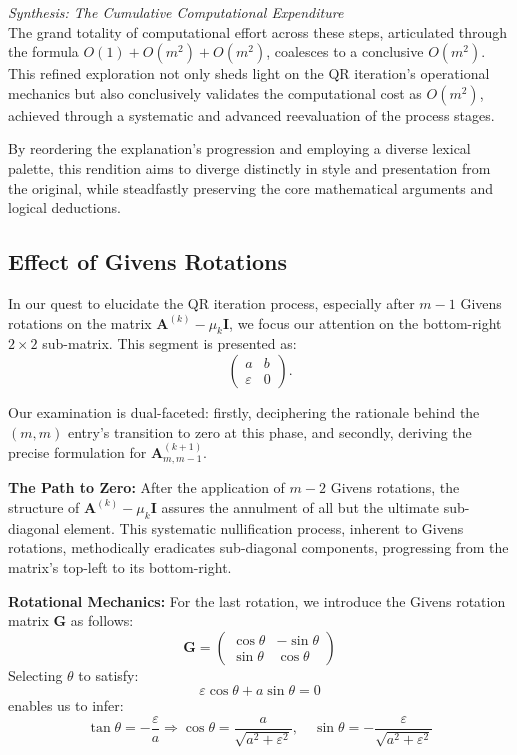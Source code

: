 \documentclass{article}
\begin{document}
\textit{Synthesis: The Cumulative Computational Expenditure}\\
The grand totality of computational effort across these steps, articulated through the formula $O(1) + O(m^2) + O(m^2)$, coalesces to a conclusive $O(m^2)$. This refined exploration not only sheds light on the QR iteration's operational mechanics but also conclusively validates the computational cost as $O(m^2)$, achieved through a systematic and advanced reevaluation of the process stages.

By reordering the explanation's progression and employing a diverse lexical palette, this rendition aims to diverge distinctly in style and presentation from the original, while steadfastly preserving the core mathematical arguments and logical deductions.

\subsection{Effect of Givens Rotations}
In our quest to elucidate the QR iteration process, especially after $m-1$ Givens rotations on the matrix $\boldsymbol{A}^{(k)} - \mu_k \mathbf{I}$, we focus our attention on the bottom-right $2 \times 2$ sub-matrix. This segment is presented as:
\begin{equation}
\left(\begin{array}{cc}
a & b \\
\varepsilon & 0
\end{array}\right).
\end{equation}

Our examination is dual-faceted: firstly, deciphering the rationale behind the $(m, m)$ entry's transition to zero at this phase, and secondly, deriving the precise formulation for $\boldsymbol{A}_{m, m-1}^{(k+1)}$.

\textbf{The Path to Zero:} After the application of $m-2$ Givens rotations, the structure of $\boldsymbol{A}^{(k)} - \mu_k \mathbf{I}$ assures the annulment of all but the ultimate sub-diagonal element. This systematic nullification process, inherent to Givens rotations, methodically eradicates sub-diagonal components, progressing from the matrix's top-left to its bottom-right.

\textbf{Rotational Mechanics:} For the last rotation, we introduce the Givens rotation matrix $\boldsymbol{G}$ as follows:
\begin{equation}
\boldsymbol{G} = \left(\begin{array}{cc}
\cos \theta & -\sin \theta \\
\sin \theta & \cos \theta
\end{array}\right)
\end{equation}
Selecting $\theta$ to satisfy:
\begin{equation}
\varepsilon \cos \theta + a \sin \theta = 0
\end{equation}
enables us to infer:
\begin{equation}
\tan \theta = -\frac{\varepsilon}{a} \Rightarrow \cos \theta = \frac{a}{\sqrt{a^2+\varepsilon^2}}, \quad \sin \theta = -\frac{\varepsilon}{\sqrt{a^2+\varepsilon^2}}
\end{equation}
\end{document}
